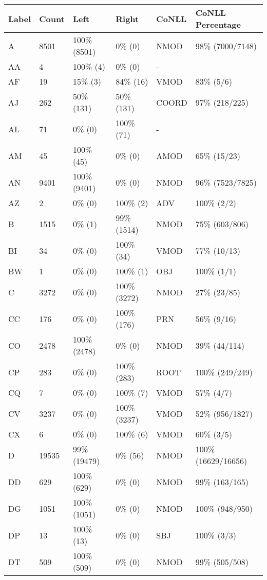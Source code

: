 \begin{figure*}
\begin{tabular}{|l|l|l|l||l|l|}
\hline
Label & Count & Left & Right & CoNLL & CoNLL Percentage\\ 
\hline
 A & 8501 & 100\% (8501) & 0\% (0) & NMOD & 98\% (7000/7148) \\ 
\hline
 AA & 4 & 100\% (4) & 0\% (0) & - &  \\ 
\hline
 AF & 19 & 15\% (3) & 84\% (16) & VMOD & 83\% (5/6) \\ 
\hline
 AJ & 262 & 50\% (131) & 50\% (131) & COORD & 97\% (218/225) \\ 
\hline
 AL & 71 & 0\% (0) & 100\% (71) & - &  \\ 
\hline
 AM & 45 & 100\% (45) & 0\% (0) & AMOD & 65\% (15/23) \\ 
\hline
 AN & 9401 & 100\% (9401) & 0\% (0) & NMOD & 96\% (7523/7825) \\ 
\hline
 AZ & 2 & 0\% (0) & 100\% (2) & ADV & 100\% (2/2) \\ 
\hline
 B & 1515 & 0\% (1) & 99\% (1514) & NMOD & 75\% (603/806) \\ 
\hline
 BI & 34 & 0\% (0) & 100\% (34) & VMOD & 77\% (10/13) \\ 
\hline
 BW & 1 & 0\% (0) & 100\% (1) & OBJ & 100\% (1/1) \\ 
\hline
 C & 3272 & 0\% (0) & 100\% (3272) & NMOD & 27\% (23/85) \\ 
\hline
 CC & 176 & 0\% (0) & 100\% (176) & PRN & 56\% (9/16) \\ 
\hline
 CO & 2478 & 100\% (2478) & 0\% (0) & NMOD & 39\% (44/114) \\ 
\hline
 CP & 283 & 0\% (0) & 100\% (283) & ROOT & 100\% (249/249) \\ 
\hline
 CQ & 7 & 0\% (0) & 100\% (7) & VMOD & 57\% (4/7) \\ 
\hline
 CV & 3237 & 0\% (0) & 100\% (3237) & VMOD & 52\% (956/1827) \\ 
\hline
 CX & 6 & 0\% (0) & 100\% (6) & VMOD & 60\% (3/5) \\ 
\hline
 D & 19535 & 99\% (19479) & 0\% (56) & NMOD & 100\% (16629/16656) \\ 
\hline
 DD & 629 & 100\% (629) & 0\% (0) & NMOD & 99\% (163/165) \\ 
\hline
 DG & 1051 & 100\% (1051) & 0\% (0) & NMOD & 100\% (948/950) \\ 
\hline
 DP & 13 & 100\% (13) & 0\% (0) & SBJ & 100\% (3/3) \\ 
\hline
 DT & 509 & 100\% (509) & 0\% (0) & NMOD & 99\% (505/508) \\ 

\end{tabular}
\end{figure*}
